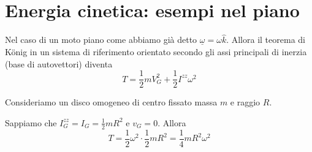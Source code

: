 \section{Energia cinetica: esempi nel piano}
Nel caso di un moto piano come abbiamo già detto \(\underline{\omega}=\omega\hat{k}\). Allora il teorema di König in un sistema di riferimento orientato secondo gli assi principali di inerzia (base di autovettori) diventa
\[
T=\frac{1}{2}mV_G^2+\frac{1}{2}I^{zz}\omega^2
\]
\begin{example}{}
Consideriamo un disco omogeneo di centro fissato massa \(m\) e raggio \(R\).

\begin{center}
\centering
{}
\end{center}

Sappiamo che \(I_G^{zz}=I_G=\frac{1}{2}mR^2\) e \(v_G=0\). Allora
\[
T=\frac{1}{2}\omega^2\cdot\frac{1}{2}mR^2=\frac{1}{4}mR^2\omega^2
\]
\end{example}


